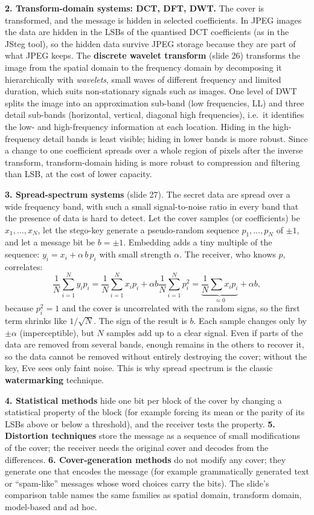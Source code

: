 \textbf{2. Transform-domain systems: DCT, DFT, DWT.} The cover is transformed, and the message is hidden in selected coefficients. In JPEG images the data are hidden in the LSBs of the quantised DCT coefficients (as in the JSteg tool), so the hidden data survive JPEG storage because they are part of what JPEG keeps. The \textbf{discrete wavelet transform} (slide 26) transforms the image from the spatial domain to the frequency domain by decomposing it hierarchically with \emph{wavelets}, small waves of different frequency and limited duration, which suits non-stationary signals such as images. One level of DWT splits the image into an approximation sub-band (low frequencies, LL) and three detail sub-bands (horizontal, vertical, diagonal high frequencies), i.e.\ it identifies the low- and high-frequency information at each location. Hiding in the high-frequency detail bands is least visible; hiding in lower bands is more robust. Since a change to one coefficient spreads over a whole region of pixels after the inverse transform, transform-domain hiding is more robust to compression and filtering than LSB, at the cost of lower capacity.

\textbf{3. Spread-spectrum systems} (slide 27). The secret data are spread over a wide frequency band, with such a small signal-to-noise ratio in every band that the presence of data is hard to detect. Let the cover samples (or coefficients) be $x_1, \dots, x_N$, let the stego-key generate a pseudo-random sequence $p_1, \dots, p_N$ of $\pm 1$, and let a message bit be $b = \pm 1$. Embedding adds a tiny multiple of the sequence: $y_i = x_i + \alpha\, b\, p_i$ with small strength $\alpha$. The receiver, who knows $p$, correlates:
\[
\frac1N \sum_{i=1}^{N} y_i p_i = \frac1N \sum_{i=1}^{N} x_i p_i + \alpha b \frac1N \sum_{i=1}^{N} p_i^2 = \underbrace{\frac1N \sum x_i p_i}_{\approx 0} + \alpha b ,
\]
because $p_i^2 = 1$ and the cover is uncorrelated with the random signs, so the first term shrinks like $1/\sqrt N$. The sign of the result is $b$. Each sample changes only by $\pm\alpha$ (imperceptible), but $N$ samples add up to a clear signal. Even if parts of the data are removed from several bands, enough remains in the others to recover it, so the data cannot be removed without entirely destroying the cover; without the key, Eve sees only faint noise. This is why spread spectrum is the classic \textbf{watermarking} technique.

\textbf{4. Statistical methods} hide one bit per block of the cover by changing a statistical property of the block (for example forcing its mean or the parity of its LSBs above or below a threshold), and the receiver tests the property. \textbf{5. Distortion techniques} store the message as a sequence of small modifications of the cover; the receiver needs the original cover and decodes from the differences. \textbf{6. Cover-generation methods} do not modify any cover; they generate one that encodes the message (for example grammatically generated text or ``spam-like'' messages whose word choices carry the bits). The slide's comparison table names the same families as spatial domain, transform domain, model-based and ad hoc.

